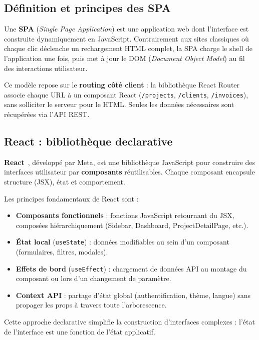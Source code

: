 \subsection{Définition et principes des SPA}

Une \textbf{SPA} (\textit{Single Page Application}) est une application web dont
l'interface est construite dynamiquement en JavaScript. Contrairement aux sites
classiques où chaque clic déclenche un rechargement HTML complet, la SPA charge le
shell de l'application une fois, puis met à jour le DOM (\textit{Document Object Model})
au fil des interactions utilisateur.

\medskip

Ce modèle repose sur le \textbf{routing côté client} : la bibliothèque React Router
associe chaque URL à un composant React (\texttt{/projects}, \texttt{/clients},
\texttt{/invoices}), sans solliciter le serveur pour le HTML. Seules les données
nécessaires sont récupérées via l'API REST.

\subsection{React : bibliothèque declarative}

\textbf{React}~\cite{react}, développé par Meta, est une bibliothèque JavaScript pour
construire des interfaces utilisateur par \textbf{composants} réutilisables. Chaque
composant encapsule structure (JSX), état et comportement.

\medskip

Les principes fondamentaux de React sont :

\begin{itemize}
  \item \textbf{Composants fonctionnels} : fonctions JavaScript retournant du JSX,
  composées hiérarchiquement (Sidebar, Dashboard, ProjectDetailPage, etc.).
  \item \textbf{État local} (\texttt{useState}) : données modifiables au sein d'un
  composant (formulaires, filtres, modales).
  \item \textbf{Effets de bord} (\texttt{useEffect}) : chargement de données API au
  montage du composant ou lors d'un changement de paramètre.
  \item \textbf{Context API} : partage d'état global (authentification, thème, langue)
  sans propager les props à travers toute l'arborescence.
\end{itemize}

Cette approche declarative simplifie la construction d'interfaces complexes : l'état
de l'interface est une fonction de l'état applicatif.

